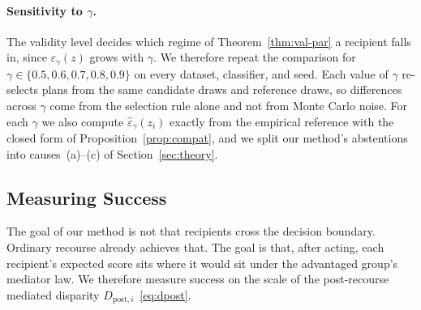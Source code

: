 \paragraph{Sensitivity to $\gamma$.}
The validity level decides which regime of Theorem~\ref{thm:val-par} a
recipient falls in, since $\varepsilon_\gamma(z)$ grows with $\gamma$. We
therefore repeat the comparison for
$\gamma\in\{0.5,0.6,0.7,0.8,0.9\}$ on every dataset, classifier, and seed.
Each value of $\gamma$ re-selects plans from the same candidate draws and
reference draws, so differences across $\gamma$ come from the selection rule
alone and not from Monte Carlo noise. For each $\gamma$ we also compute
$\hat\varepsilon_\gamma(z_i)$ exactly from the empirical reference with the
closed form of Proposition~\ref{prop:compat}, and we split our method's
abstentions into causes~(a)--(c) of Section~\ref{sec:theory}.

\subsection{Measuring Success}
\label{sec:exp_metric}

The goal of our method is not that recipients cross the decision boundary.
Ordinary recourse already achieves that. The goal is that, after acting, each
recipient's expected score sits where it would sit under the advantaged
group's mediator law. We therefore measure success on the scale of the
post-recourse mediated disparity $D_{\mathrm{post},i}$~\eqref{eq:dpost}.

